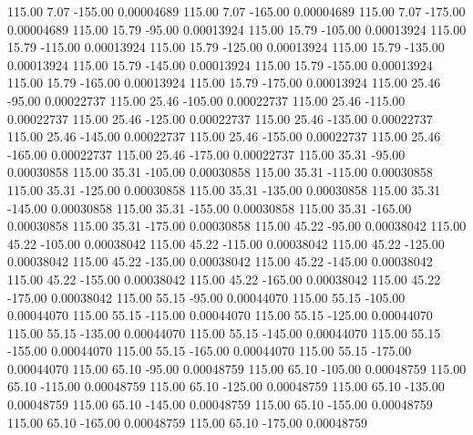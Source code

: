     115.00      7.07   -155.00     0.00004689
    115.00      7.07   -165.00     0.00004689
    115.00      7.07   -175.00     0.00004689
    115.00     15.79    -95.00     0.00013924
    115.00     15.79   -105.00     0.00013924
    115.00     15.79   -115.00     0.00013924
    115.00     15.79   -125.00     0.00013924
    115.00     15.79   -135.00     0.00013924
    115.00     15.79   -145.00     0.00013924
    115.00     15.79   -155.00     0.00013924
    115.00     15.79   -165.00     0.00013924
    115.00     15.79   -175.00     0.00013924
    115.00     25.46    -95.00     0.00022737
    115.00     25.46   -105.00     0.00022737
    115.00     25.46   -115.00     0.00022737
    115.00     25.46   -125.00     0.00022737
    115.00     25.46   -135.00     0.00022737
    115.00     25.46   -145.00     0.00022737
    115.00     25.46   -155.00     0.00022737
    115.00     25.46   -165.00     0.00022737
    115.00     25.46   -175.00     0.00022737
    115.00     35.31    -95.00     0.00030858
    115.00     35.31   -105.00     0.00030858
    115.00     35.31   -115.00     0.00030858
    115.00     35.31   -125.00     0.00030858
    115.00     35.31   -135.00     0.00030858
    115.00     35.31   -145.00     0.00030858
    115.00     35.31   -155.00     0.00030858
    115.00     35.31   -165.00     0.00030858
    115.00     35.31   -175.00     0.00030858
    115.00     45.22    -95.00     0.00038042
    115.00     45.22   -105.00     0.00038042
    115.00     45.22   -115.00     0.00038042
    115.00     45.22   -125.00     0.00038042
    115.00     45.22   -135.00     0.00038042
    115.00     45.22   -145.00     0.00038042
    115.00     45.22   -155.00     0.00038042
    115.00     45.22   -165.00     0.00038042
    115.00     45.22   -175.00     0.00038042
    115.00     55.15    -95.00     0.00044070
    115.00     55.15   -105.00     0.00044070
    115.00     55.15   -115.00     0.00044070
    115.00     55.15   -125.00     0.00044070
    115.00     55.15   -135.00     0.00044070
    115.00     55.15   -145.00     0.00044070
    115.00     55.15   -155.00     0.00044070
    115.00     55.15   -165.00     0.00044070
    115.00     55.15   -175.00     0.00044070
    115.00     65.10    -95.00     0.00048759
    115.00     65.10   -105.00     0.00048759
    115.00     65.10   -115.00     0.00048759
    115.00     65.10   -125.00     0.00048759
    115.00     65.10   -135.00     0.00048759
    115.00     65.10   -145.00     0.00048759
    115.00     65.10   -155.00     0.00048759
    115.00     65.10   -165.00     0.00048759
    115.00     65.10   -175.00     0.00048759
